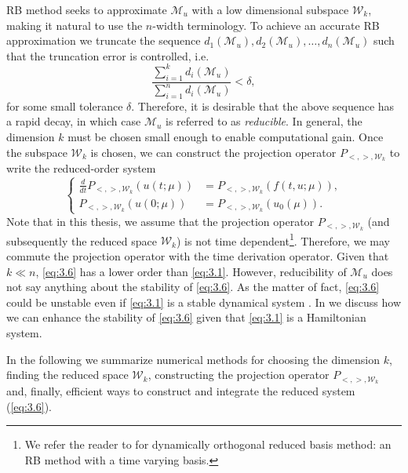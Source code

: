RB method seeks to approximate $\mathcal M_u$ with a low dimensional subspace $\mathcal W_k$, making it natural to use the $n$-width terminology. To achieve an accurate RB approximation we truncate the sequence $d_1(\mathcal M_u),d_2(\mathcal M_u),\dots, d_n(\mathcal M_u)$ such that the truncation error is controlled, i.e.
\begin{equation} \label{eq:3.5}
	\frac{\sum_{i=1}^k d_i(\mathcal M_u) }{\sum_{i=1}^n d_i(\mathcal M_u) } < \delta,
\end{equation}
for some small tolerance $\delta$. Therefore, it is desirable that the above sequence has a rapid decay, in which case $\mathcal M_u$ is referred to as \emph{reducible}. In general, the dimension $k$ must be chosen small enough to enable computational gain. Once the subspace $\mathcal W_k$ is chosen, we can construct the projection operator $P_{<,>,\mathcal W_k}$ to write the reduced-order system
\begin{equation} \label{eq:3.6}
\left\{
\begin{aligned}
	\frac d{dt} P_{<,>,\mathcal W_k}(u(t;\mu)) &= P_{<,>,\mathcal W_k}(f(t,u;\mu)),\\
	P_{<,>,\mathcal W_k}(u(0;\mu)) &= P_{<,>,\mathcal W_k}( u_0(\mu) ).
\end{aligned}
\right.
\end{equation}
Note that in this thesis, we assume that the projection operator $P_{<,>,\mathcal W_k}$ (and subsequently the reduced space $\mathcal W_k$) is not time dependent\footnote{We refer the reader to \cite{doi:10.1137/140967787,doi:10.1137/16M1095202} for dynamically orthogonal reduced basis method: an RB method with a time varying basis.}. Therefore, we may commute the projection operator with the time derivation operator. Given that $k \ll n$, \eqref{eq:3.6} has a lower order than \eqref{eq:3.1}. However, reducibility of $\mathcal M_u$ does not say anything about the stability of \eqref{eq:3.6}. As the matter of fact, \eqref{eq:3.6} could be unstable even if \eqref{eq:3.1} is a stable dynamical system \cite{doi:10.1137/140978922,doi:10.1137/17M1111991}. In  we discuss how we can enhance the stability of \eqref{eq:3.6} given that \eqref{eq:3.1} is a Hamiltonian system.

In the following we summarize numerical methods for choosing the dimension $k$, finding the reduced space $\mathcal W_k$, constructing the projection operator $P_{<,>,\mathcal W_k}$ and, finally, efficient ways to construct and integrate the reduced system (\ref{eq:3.6}).

